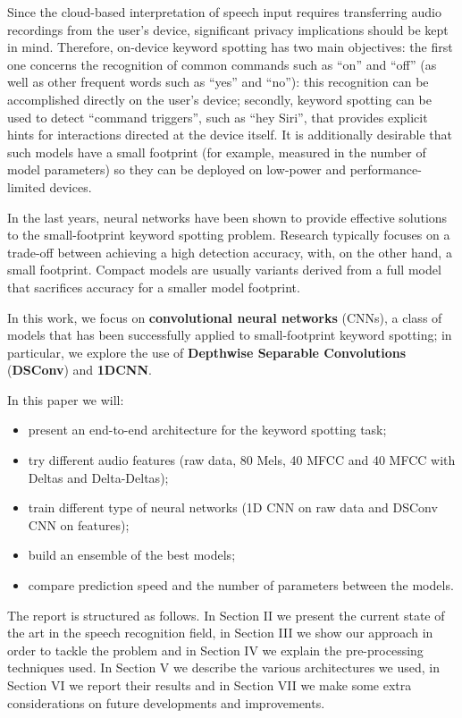 \documentclass[conference]{IEEEtran}
\begin{document}
Since the cloud-based interpretation of speech input requires transferring audio recordings from the user’s device, significant privacy implications should be kept in mind. Therefore, on-device keyword spotting has two main objectives: the first one concerns the recognition of common commands such as “on” and “off” (as well as other frequent words such as “yes” and “no”): this recognition can be accomplished directly on the user’s device; secondly, keyword spotting can be used to detect “command triggers”, such as “hey Siri”, that provides explicit hints for interactions directed at the device itself. It is additionally desirable that such models have a small footprint (for example, measured in the number of model parameters) so they can be deployed on low-power and performance-limited devices.

In the last years, neural networks have been shown to provide effective solutions to the small-footprint keyword spotting problem. Research typically focuses on a trade-off between achieving a high detection accuracy, with, on the other hand, a small footprint. Compact models are usually variants derived from a full model that sacrifices accuracy for a smaller model footprint.

In this work, we focus on \textbf{convolutional neural networks} (CNNs), a class of models that has been successfully applied to small-footprint keyword spotting; in particular, we explore the use of \textbf{Depthwise Separable Convolutions} (\textbf{DSConv}) and \textbf{1DCNN}.

In this paper we will: 
\begin{itemize}
\setlength{\itemsep}{0pt}
  \setlength{\parskip}{0pt}
  \setlength{\parsep}{0pt}
\item present an end-to-end architecture for the keyword spotting task;
\item try different audio features (raw data, 80 Mels, 40 MFCC and 40 MFCC with Deltas and Delta-Deltas);
\item train different type of neural networks (1D CNN on raw data and DSConv CNN on features);
\item build an ensemble of the best models;
\item compare prediction speed and the number of parameters between the models.
\end{itemize}

The report is structured as follows. In Section II we present the current state of the art in the speech recognition field, in Section III we show our approach in order to tackle the problem and in Section IV we explain the pre-processing techniques used. In Section V we describe the various architectures we used, in Section VI we report their results and in Section VII we make some extra considerations on future developments and improvements.
\end{document}
